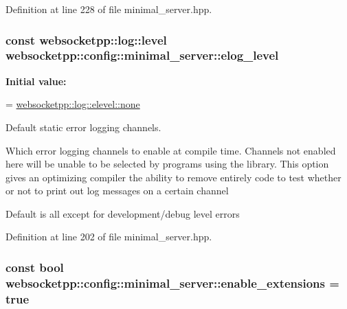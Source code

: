 Definition at line 228 of file minimal\+\_\+server.\+hpp.

\hypertarget{structwebsocketpp_1_1config_1_1minimal__server_a3682c9c0dc879a125eff396be7babf4e}{}
\subsubsection[{elog\+\_\+level}]{\setlength{\rightskip}{0pt plus 5cm}const {\bf websocketpp\+::log\+::level} websocketpp\+::config\+::minimal\+\_\+server\+::elog\+\_\+level\hspace{0.3cm}{\ttfamily [static]}}\label{structwebsocketpp_1_1config_1_1minimal__server_a3682c9c0dc879a125eff396be7babf4e}
{\bfseries Initial value\+:}
\begin{DoxyCode}
=
        \hyperlink{structwebsocketpp_1_1log_1_1elevel_ae86395aa26ec2089e07fd63b62a549fa}{websocketpp::log::elevel::none}
\end{DoxyCode}


Default static error logging channels. 

Which error logging channels to enable at compile time. Channels not enabled here will be unable to be selected by programs using the library. This option gives an optimizing compiler the ability to remove entirely code to test whether or not to print out log messages on a certain channel

Default is all except for development/debug level errors 

Definition at line 202 of file minimal\+\_\+server.\+hpp.

\hypertarget{structwebsocketpp_1_1config_1_1minimal__server_ae25bd7e239136a81b9756d6be0818466}{}
\subsubsection[{enable\+\_\+extensions}]{\setlength{\rightskip}{0pt plus 5cm}const bool websocketpp\+::config\+::minimal\+\_\+server\+::enable\+\_\+extensions = true\hspace{0.3cm}{\ttfamily [static]}}\label{structwebsocketpp_1_1config_1_1minimal__server_ae25bd7e239136a81b9756d6be0818466}


